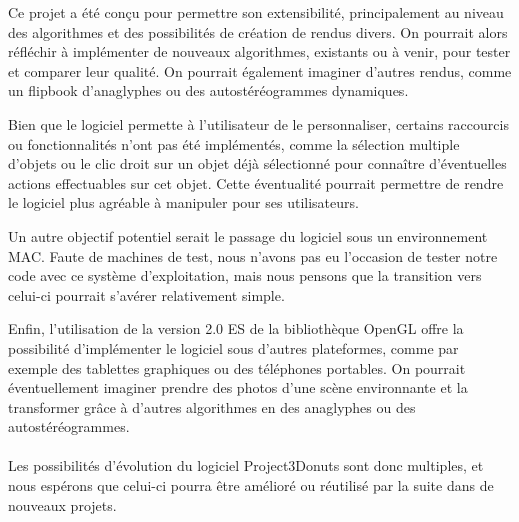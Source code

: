 Ce projet a été conçu pour permettre son extensibilité, principalement au niveau des algorithmes et des possibilités de création de rendus divers. On pourrait alors réfléchir à implémenter de nouveaux algorithmes, existants ou à venir, pour tester et comparer leur qualité. On pourrait également imaginer d'autres rendus, comme un flipbook d'anaglyphes ou des autostéréogrammes dynamiques.

Bien que le logiciel permette à l'utilisateur de le personnaliser, certains raccourcis ou fonctionnalités n'ont pas été implémentés, comme la sélection multiple d'objets ou le clic droit sur un objet déjà sélectionné pour connaître d'éventuelles actions effectuables sur cet objet. Cette éventualité pourrait permettre de rendre le logiciel plus agréable à manipuler pour ses utilisateurs.

Un autre objectif potentiel serait le passage du logiciel sous un environnement MAC. Faute de machines de test, nous n'avons pas eu l'occasion de tester notre code avec ce système d'exploitation, mais nous pensons que la transition vers celui-ci pourrait s'avérer relativement simple.

Enfin, l'utilisation de la version 2.0 ES de la bibliothèque OpenGL offre la possibilité d'implémenter le logiciel sous d'autres plateformes, comme par exemple des tablettes graphiques ou des téléphones portables. On pourrait éventuellement imaginer prendre des photos d'une scène environnante et la transformer grâce à d'autres algorithmes en des anaglyphes ou des autostéréogrammes. 

\paragraph{}
Les possibilités d'évolution du logiciel Project3Donuts sont donc multiples, et nous espérons que celui-ci pourra être amélioré ou réutilisé par la suite dans de nouveaux projets.
